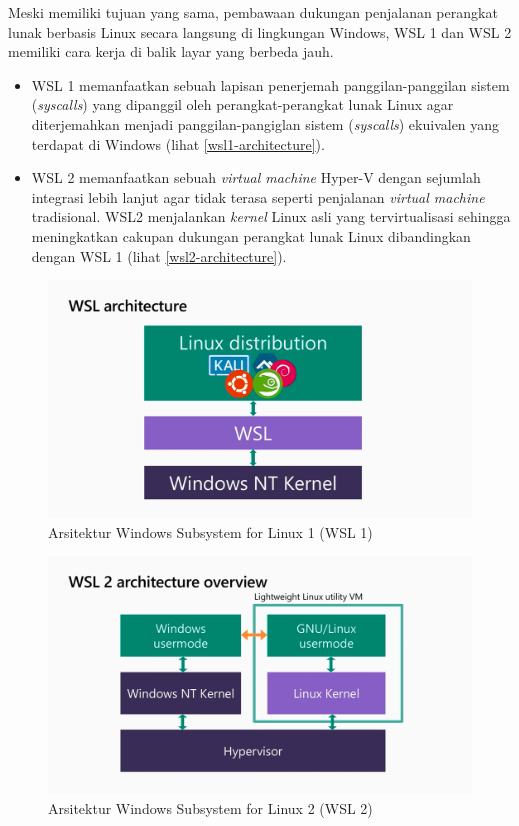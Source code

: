 Meski memiliki tujuan yang sama, pembawaan dukungan penjalanan perangkat lunak berbasis Linux secara langsung di lingkungan Windows, WSL 1 dan WSL 2 memiliki cara kerja di balik layar yang berbeda jauh.
\begin{itemize}
    \item WSL 1 memanfaatkan sebuah lapisan penerjemah panggilan-panggilan sistem (\textit{syscalls}) yang dipanggil oleh perangkat-perangkat lunak Linux agar diterjemahkan menjadi panggilan-pangiglan sistem (\textit{syscalls}) ekuivalen yang terdapat di Windows (lihat \autoref{wsl1-architecture}).

    \item WSL 2 memanfaatkan sebuah \textit{virtual machine} Hyper-V dengan sejumlah integrasi lebih lanjut agar tidak terasa seperti penjalanan \textit{virtual machine} tradisional. WSL2 menjalankan \textit{kernel} Linux asli yang tervirtualisasi sehingga meningkatkan cakupan dukungan perangkat lunak Linux dibandingkan dengan WSL 1 (lihat \autoref{wsl2-architecture}).
\end{itemize}

\begin{figure}
    \centering
    \includegraphics[width=1\linewidth]{assets/wsl1-architecture-extracted-from-pendadaran-slides.png}
    \caption{Arsitektur Windows Subsystem for Linux 1 (WSL 1) \cite{youtube-new-wsl-architecture}}
    \label{wsl1-architecture}
\end{figure}

\begin{figure}
    \centering
    \includegraphics[width=1\linewidth]{assets/wsl2-architecture-extracted-from-pendadaran-slides.png}
    \caption{Arsitektur Windows Subsystem for Linux 2 (WSL 2) \cite{youtube-new-wsl-architecture}}
    \label{wsl2-architecture}
\end{figure}

